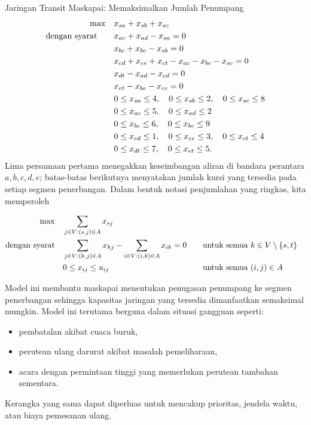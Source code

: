\begin{examplewithallcode}{Jaringan Transit Maskapai: Memaksimalkan Jumlah Penumpang}
\smallskip {}
\begin{align*}
\max \quad & x_{sa} + x_{sb} + x_{sc} \\
\mbox{dengan syarat}\quad \quad
& x_{ac} + x_{ad} - x_{sa} = 0 \\
& x_{bc} + x_{be} - x_{sb} = 0 \\
& x_{cd} + x_{ce} + x_{ct} - x_{ac} - x_{bc} - x_{sc} = 0 \\
& x_{dt} - x_{ad} - x_{cd} = 0 \\
& x_{et} - x_{be} - x_{ce} = 0 \\
& 0 \leq x_{sa} \leq 4,\quad 0 \leq x_{sb} \leq 2,\quad 0 \leq x_{sc} \leq 8 \\
& 0 \leq x_{ac} \leq 5,\quad 0 \leq x_{ad} \leq 2 \\
& 0 \leq x_{bc} \leq 6,\quad 0 \leq x_{be} \leq 9 \\
& 0 \leq x_{cd} \leq 1,\quad 0 \leq x_{ce} \leq 3,\quad 0 \leq x_{ct} \leq 4 \\
& 0 \leq x_{dt} \leq 7,\quad 0 \leq x_{et} \leq 5.
\end{align*}
Lima persamaan pertama menegakkan keseimbangan aliran di bandara
perantara $a,b,c,d,e$; batas-batas berikutnya menyatakan jumlah kursi yang
tersedia pada setiap segmen penerbangan.
\newpage
Dalam bentuk notasi penjumlahan yang ringkas, kita memperoleh

$$
\begin{aligned}
\max \quad & \sum_{j \in V : (s,j) \in A} x_{sj} \\
\mbox{dengan syarat}\quad        & \sum_{j \in V : (k,j) \in A} x_{kj} - \sum_{i \in V : (i,k) \in A} x_{ik} = 0 &&\quad \mbox{untuk semua } k \in V \setminus \{s,t\} \\
           & 0 \leq x_{ij} \leq u_{ij} &&\quad \mbox{untuk semua } (i,j) \in A
\end{aligned}
$$

\vspace{0.5em}
\noindent Model ini membantu maskapai menentukan penugasan penumpang ke segmen penerbangan sehingga kapasitas jaringan yang tersedia dimanfaatkan semaksimal mungkin. Model ini terutama berguna dalam situasi gangguan seperti:
\begin{itemize}
    \item pembatalan akibat cuaca buruk,
    \item perutean ulang darurat akibat masalah pemeliharaan,
    \item acara dengan permintaan tinggi yang memerlukan perutean tambahan sementara.
\end{itemize}

Kerangka yang sama dapat diperluas untuk mencakup prioritas, jendela waktu, atau biaya pemesanan ulang.
\end{examplewithallcode}

